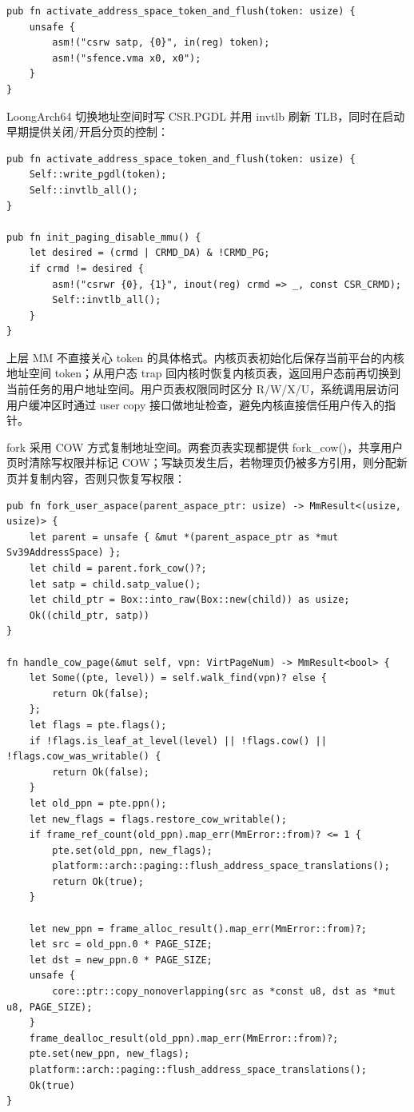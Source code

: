 \documentclass[12pt,openany,oneside,AutoFakeBold=true]{ctexbook}
\newcommand{\code}[1]{\textnormal{\rmfamily #1}}
\begin{document}
\begin{lstlisting}
pub fn activate_address_space_token_and_flush(token: usize) {
    unsafe {
        asm!("csrw satp, {0}", in(reg) token);
        asm!("sfence.vma x0, x0");
    }
}
\end{lstlisting}

LoongArch64 切换地址空间时写 \code{CSR.PGDL} 并用 \code{invtlb} 刷新 TLB，同时在启动早期提供关闭/开启分页的控制：

\begin{lstlisting}
pub fn activate_address_space_token_and_flush(token: usize) {
    Self::write_pgdl(token);
    Self::invtlb_all();
}

pub fn init_paging_disable_mmu() {
    let desired = (crmd | CRMD_DA) & !CRMD_PG;
    if crmd != desired {
        asm!("csrwr {0}, {1}", inout(reg) crmd => _, const CSR_CRMD);
        Self::invtlb_all();
    }
}
\end{lstlisting}

上层 MM 不直接关心 token 的具体格式。内核页表初始化后保存当前平台的内核地址空间 token；从用户态 trap 回内核时恢复内核页表，返回用户态前再切换到当前任务的用户地址空间。用户页表权限同时区分 R/W/X/U，系统调用层访问用户缓冲区时通过 user copy 接口做地址检查，避免内核直接信任用户传入的指针。

fork 采用 COW 方式复制地址空间。两套页表实现都提供 \code{fork\_cow()}，共享用户页时清除写权限并标记 COW；写缺页发生后，若物理页仍被多方引用，则分配新页并复制内容，否则只恢复写权限：

\begin{lstlisting}
pub fn fork_user_aspace(parent_aspace_ptr: usize) -> MmResult<(usize, usize)> {
    let parent = unsafe { &mut *(parent_aspace_ptr as *mut Sv39AddressSpace) };
    let child = parent.fork_cow()?;
    let satp = child.satp_value();
    let child_ptr = Box::into_raw(Box::new(child)) as usize;
    Ok((child_ptr, satp))
}

fn handle_cow_page(&mut self, vpn: VirtPageNum) -> MmResult<bool> {
    let Some((pte, level)) = self.walk_find(vpn)? else {
        return Ok(false);
    };
    let flags = pte.flags();
    if !flags.is_leaf_at_level(level) || !flags.cow() || !flags.cow_was_writable() {
        return Ok(false);
    }
    let old_ppn = pte.ppn();
    let new_flags = flags.restore_cow_writable();
    if frame_ref_count(old_ppn).map_err(MmError::from)? <= 1 {
        pte.set(old_ppn, new_flags);
        platform::arch::paging::flush_address_space_translations();
        return Ok(true);
    }

    let new_ppn = frame_alloc_result().map_err(MmError::from)?;
    let src = old_ppn.0 * PAGE_SIZE;
    let dst = new_ppn.0 * PAGE_SIZE;
    unsafe {
        core::ptr::copy_nonoverlapping(src as *const u8, dst as *mut u8, PAGE_SIZE);
    }
    frame_dealloc_result(old_ppn).map_err(MmError::from)?;
    pte.set(new_ppn, new_flags);
    platform::arch::paging::flush_address_space_translations();
    Ok(true)
}
\end{lstlisting}
\end{document}
